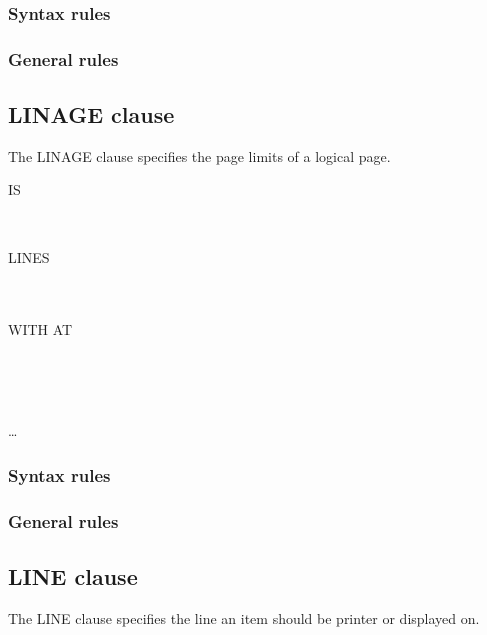 \subsubsection{Syntax rules}

\subsubsection{General rules}

\subsection{LINAGE clause}

The LINAGE clause specifies the page limits of a logical page.

\begin{syntax}
   IS
  \begin{1=}
    \identifier \\
    \literal
  \end{1=}
  LINES
  \begin{0-1}
    \begin{1=}
       \\
       \\
      WITH  AT
    \end{1=}
    \begin{1=}
      \identifier \\
      \literal
    \end{1=} \\
  \end{0-1}
  \ldots \\
\end{syntax}

\subsubsection{Syntax rules}

\subsubsection{General rules}

\subsection{LINE clause}

The LINE clause specifies the line an item should be printer or displayed on.

